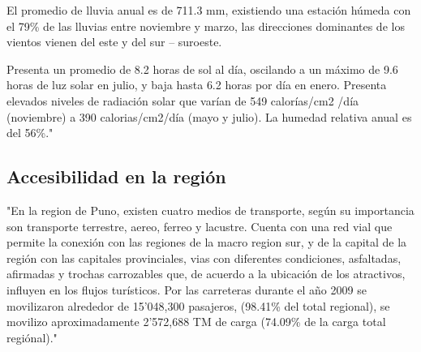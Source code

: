 El promedio de lluvia anual es de 711.3 mm, existiendo una estación húmeda con el 79\% de las lluvias entre noviembre y marzo, las direcciones dominantes de los vientos vienen del este y del sur – suroeste.

Presenta un promedio de 8.2 horas de sol al día, oscilando a un máximo de 9.6 horas de luz solar en julio, y baja hasta 6.2 horas por día en enero. Presenta elevados niveles de radiación solar que varían de 549 calorías/cm2 /día (noviembre) a 390 calorias/cm2/día (mayo y julio). La humedad relativa anual es del 56\%." \cite{2011PlanPERTUR}
\subsection{Accesibilidad en la región}
"En la region de Puno, existen cuatro medios de transporte, según su importancia son transporte terrestre, aereo, ferreo y lacustre. Cuenta con una red vial que permite la conexión con las regiones de la macro region sur, y de la capital de la región con las capitales provinciales, vias con diferentes condiciones, asfaltadas, afirmadas y trochas carrozables que, de acuerdo a la ubicación de los atractivos, influyen en los flujos turísticos. Por las carreteras durante el año 2009 se movilizaron alrededor de 15’048,300 pasajeros, (98.41\% del total regional), se movilizo aproximadamente 2’572,688 TM de carga (74.09\% de la carga total regiónal)." \cite{2011PlanPERTUR}

